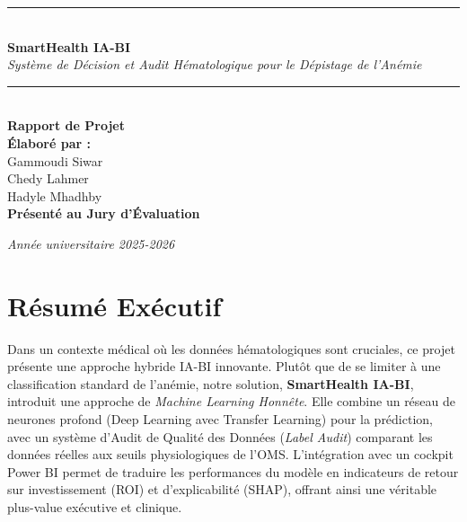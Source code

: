 \documentclass[12pt,a4paper]{article}
\begin{document}
\begin{titlepage}
    \centering
    \vspace*{2cm}
    
    \rule{\linewidth}{0.5mm} \\[0.5cm]
    {\Huge \textbf{SmartHealth IA-BI}} \\[0.3cm]
    {\Large \textit{Système de Décision et Audit Hématologique pour le Dépistage de l'Anémie}} \\[0.2cm]
    \rule{\linewidth}{0.5mm} \\[1.5cm]
    
    {\Large \textbf{Rapport de Projet}} \\[2cm]
    
    {\Large \textbf{Élaboré par :}} \\[0.5cm]
    {\large Gammoudi Siwar} \\[0.2cm]
    {\large Chedy Lahmer} \\[0.2cm]
    {\large Hadyle Mhadhby} \\[2cm]
    
    {\Large \textbf{Présenté au Jury d'Évaluation}} \\[0.5cm]
    
    \vfill
    
    {\small \textit{Année universitaire 2025-2026}}
\end{titlepage}

\thispagestyle{empty}

\newpage
\section*{Résumé Exécutif}

Dans un contexte médical où les données hématologiques sont cruciales, ce projet présente une approche hybride IA-BI innovante. Plutôt que de se limiter à une classification standard de l'anémie, notre solution, \textbf{SmartHealth IA-BI}, introduit une approche de \textit{Machine Learning Honnête}. Elle combine un réseau de neurones profond (Deep Learning avec Transfer Learning) pour la prédiction, avec un système d'Audit de Qualité des Données (\textit{Label Audit}) comparant les données réelles aux seuils physiologiques de l'OMS. L'intégration avec un cockpit Power BI permet de traduire les performances du modèle en indicateurs de retour sur investissement (ROI) et d'explicabilité (SHAP), offrant ainsi une véritable plus-value exécutive et clinique.
\end{document}
